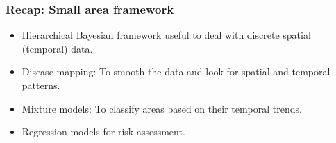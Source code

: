 \documentclass[slidestop,compress,serif,10pt]{beamer}
\begin{document}
\begin{frame}\frametitle{Recap: Small area framework}
\begin{itemize}
\vfill\item Hierarchical Bayesian framework useful to deal with discrete spatial (temporal) data.
\vfill\item Disease mapping: To smooth the data and look for spatial and temporal patterns. 
\vfill\item Mixture models: To classify areas based on their temporal trends.
\vfill\item Regression models for risk assessment. 
\end{itemize}
\end{frame}
\end{document}
